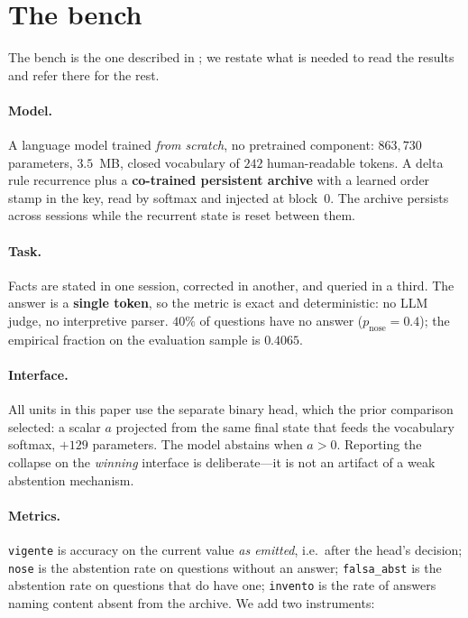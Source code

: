 \documentclass[11pt]{article}
\begin{document}
\section{The bench}
\label{sec:bench}

The bench is the one described in \citet{speranza2026abstention}; we restate what is needed to read
the results and refer there for the rest.

\paragraph{Model.} A language model trained \emph{from scratch}, no pretrained component:
$863{,}730$ parameters, $3.5$~MB, closed vocabulary of $242$ human-readable tokens. A delta rule
recurrence plus a \textbf{co-trained persistent archive} with a learned order stamp in the key, read
by softmax and injected at block~0. The archive persists across sessions while the recurrent state is
reset between them.

\paragraph{Task.} Facts are stated in one session, corrected in another, and queried in a third. The
answer is a \textbf{single token}, so the metric is exact and deterministic: no LLM judge, no
interpretive parser. $40\%$ of questions have no answer ($p_{\mathrm{nose}} = 0.4$); the empirical
fraction on the evaluation sample is $0.4065$.

\paragraph{Interface.} All units in this paper use the separate binary head, which the prior
comparison selected: a scalar $a$ projected from the same final state that feeds the vocabulary
softmax, $+129$ parameters. The model abstains when $a > 0$. Reporting the collapse on the
\emph{winning} interface is deliberate---it is not an artifact of a weak abstention mechanism.

\paragraph{Metrics.} \texttt{vigente} is accuracy on the current value \emph{as emitted}, i.e.\ after
the head's decision; \texttt{nose} is the abstention rate on questions without an answer;
\texttt{falsa\_abst} is the abstention rate on questions that do have one; \texttt{invento} is the
rate of answers naming content absent from the archive. We add two instruments:
\end{document}
